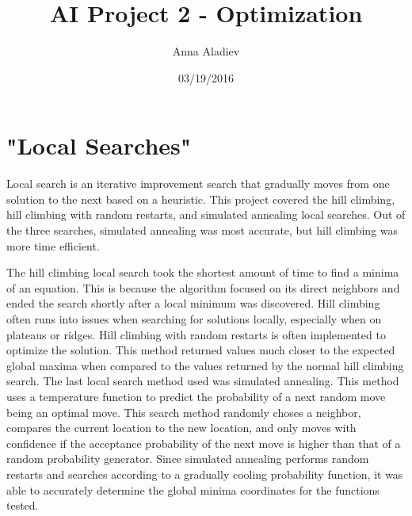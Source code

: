 \title{AI Project 2 - Optimization}
\author{Anna Aladiev}
\date{03/19/2016}
\maketitle

	
	\section{"Local Searches"}
	
	Local search is an iterative improvement search that gradually moves from one solution to the next based on a heuristic. This project covered the hill climbing, hill climbing with random restarts, and simulated annealing local searches. Out of the three searches, simulated annealing was most accurate, but hill climbing was more time efficient. 
	
	The hill climbing local search took the shortest amount of time to find a minima of an equation. This is because the algorithm focused on its direct neighbors and ended the search shortly after a local minimum was discovered. Hill climbing often runs into issues when searching for solutions locally, especially when on plateaus or ridges. Hill climbing with random restarts is often implemented to optimize the solution. This method returned values much closer to the expected global maxima when compared to the values returned by the normal hill climbing search. The last local search method used was simulated annealing. This method uses a temperature function to predict the probability of a next random move being an optimal move. This search method randomly choses a neighbor, compares the current location to the new location, and only moves with confidence if the acceptance probability of the next move is higher than that of a random probability generator. Since simulated annealing performs random restarts and searches according to a gradually cooling probability function, it was able to accurately determine the global minima coordinates for the functions tested. 
	
	
	